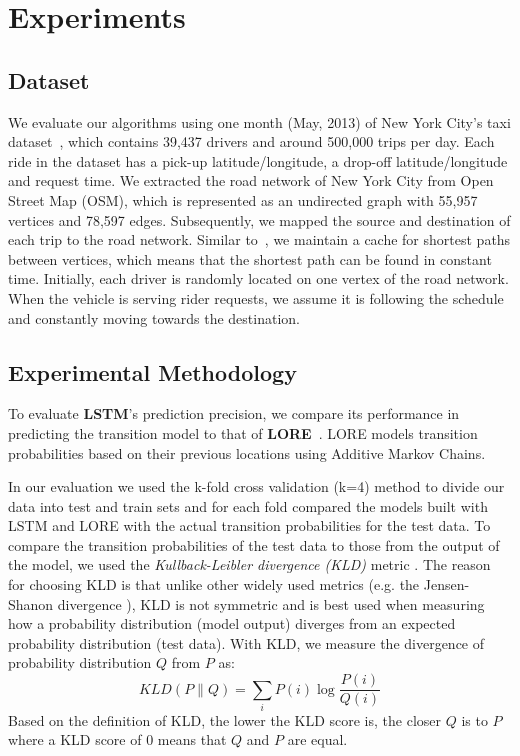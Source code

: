 \section{Experiments}
\label{sec:experiments}

\subsection{Dataset}

We evaluate our algorithms using one month (May, 2013) of  New York City's taxi dataset~\cite{nyc}, which contains 39,437 drivers and around 500,000 trips per day. Each ride in the dataset has a pick-up latitude/longitude, a drop-off latitude/longitude and request time. We extracted the road network of New York City from Open Street Map (OSM), which is represented as an undirected graph with 55,957 vertices and 78,597 edges. Subsequently, we mapped the source and destination of each trip to the road network. Similar to~\cite{Huang14}, we maintain a cache for shortest paths between vertices, which means that the shortest path can be found in constant time. Initially, each driver is randomly located on one vertex of the road network. When the vehicle is serving rider requests, we assume it is following the schedule and constantly moving towards the destination.

\subsection{Experimental Methodology}

To evaluate \textbf{LSTM}'s prediction precision, we compare its performance in predicting the transition model to that of \textbf{LORE}~\cite{Zhang14}. LORE models transition probabilities based on their previous locations using Additive Markov Chains.

In our evaluation we used the k-fold cross validation (k=4) method to divide our data into test and train sets and for each fold compared the models built with LSTM and LORE with the actual transition probabilities for the test data. To compare the transition probabilities of the test data to those from the output of the model, we used the \emph{Kullback-Leibler divergence (KLD)} metric \cite{kullback51}. The reason for choosing KLD is that unlike other widely used metrics (e.g. the Jensen-Shanon divergence \cite{Rubner98}), KLD is not symmetric and is best used when measuring how a probability distribution (model output) diverges from an expected probability distribution (test data). With KLD, we measure the divergence of probability distribution $Q$ from $P$ as:
\begin{equation*}
KLD\left(P \middle\| Q\right)=\sum_i P(i) \log \frac{P(i)}{Q(i)}
\end{equation*}
Based on the definition of KLD, the lower the KLD score is, the closer $Q$ is to $P$ where a KLD score of $0$ means that $Q$ and $P$ are equal.

